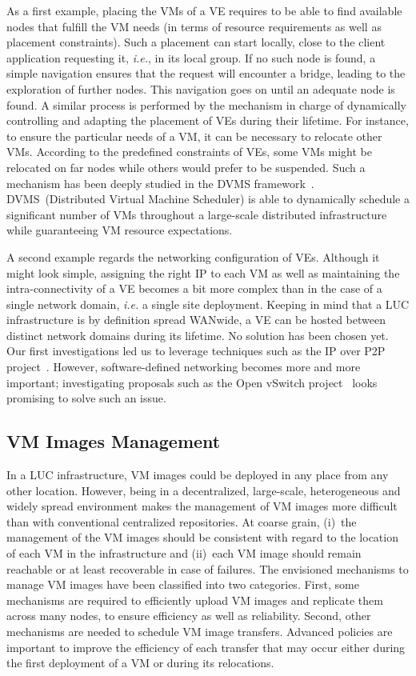 As a first example, placing the VMs of a VE requires to be able to find available nodes that
fulfill the VM needs (in terms of resource requirements as well as placement
constraints). Such a placement can start locally, close to the client
application requesting it, \textit{i.e.}, in its local group. If no such node is
found, a simple navigation ensures that the request will encounter a bridge,
leading to the exploration of further nodes. This navigation goes
on until an adequate node is found.
A similar process is performed by the mechanism in charge of  dynamically
controlling and adapting the placement of VEs during their lifetime.  For instance, 
to ensure the particular needs of a VM, it can be necessary to relocate other VMs.
According to the predefined constraints of VEs, some VMs might be
relocated on far nodes while others would prefer to be suspended.  Such a
mechanism has been deeply studied in the DVMS
framework~\cite{dvms:wiki,quesnel:2012}. DVMS~(Distributed Virtual
Machine Scheduler) is able to dynamically schedule a significant number of VMs
throughout a large-scale distributed infrastructure while guaranteeing VM
resource expectations.  

A second example regards the networking configuration of VEs.
Although it might look simple, assigning the right IP to
each VM as well as maintaining the intra-connectivity of a VE becomes a bit more complex than in
the case of a single network domain, \textit{i.e.} a single site deployment.
%
Keeping in mind that a LUC infrastructure is
by definition spread WANwide, a VE can be hosted between distinct network
domains during its lifetime. No solution has been chosen yet. 
Our first investigations led us to leverage techniques
such as the IP over P2P project~\cite{ganguly:2006}. However,
software-defined networking becomes more and more important; investigating proposals such as
the Open vSwitch project~\cite{pfaff:2009} looks promising to solve such an issue.
%

\subsection{VM Images Management}

In a LUC infrastructure, VM images could be deployed in any place from any
other location. However, being in a decentralized, large-scale, heterogeneous and widely spread
environment makes the management of VM images more difficult than with
conventional centralized repositories.  
At coarse grain, (i)~the management of the VM images should be consistent
with regard to the location of each VM in the \discovery infrastructure and
(ii)~each VM image should remain reachable or at least recoverable in case of failures.
%
The envisioned mechanisms to manage VM images have been
classified into two categories.
%
First, some mechanisms are required to efficiently
upload VM images and replicate them across many nodes, to ensure
efficiency as well as reliability.  Second, other mechanisms 
are needed to schedule VM image
transfers. Advanced policies are important to improve the efficiency of each
transfer that may occur either during the first deployment of a VM or during its relocations. 

